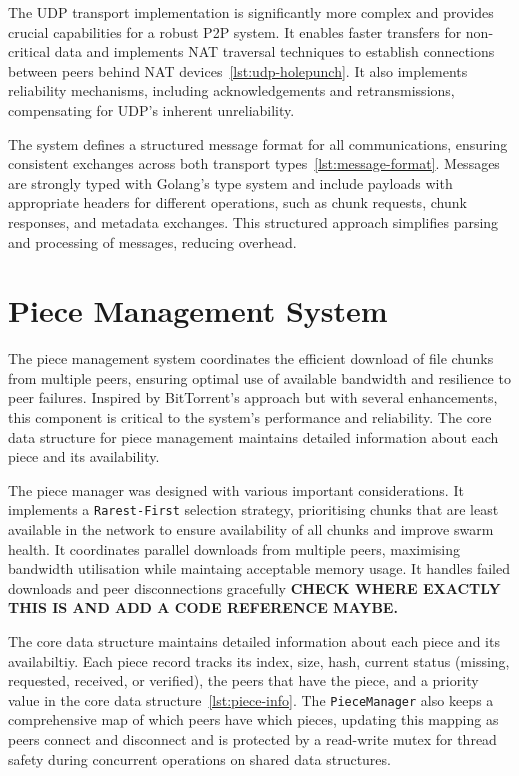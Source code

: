 \documentclass[12pt,a4paper]{report}
\begin{document}
The UDP transport implementation is significantly more complex and provides crucial capabilities for a robust P2P system. It enables faster transfers for non-critical data and implements NAT traversal techniques to establish connections between peers behind NAT devices~\ref{lst:udp-holepunch}. It also implements reliability mechanisms, including acknowledgements and retransmissions, compensating for UDP's inherent unreliability.

The system defines a structured message format for all communications, ensuring consistent exchanges across both transport types~\ref{lst:message-format}. Messages are strongly typed with Golang's type system and include payloads with appropriate headers for different operations, such as chunk requests, chunk responses, and metadata exchanges. This structured approach simplifies parsing and processing of messages, reducing overhead.

\section{Piece Management System}
The piece management system coordinates the efficient download of file chunks from multiple peers, ensuring optimal use of available bandwidth and resilience to peer failures. Inspired by BitTorrent's approach but with several enhancements, this component is critical to the system's performance and reliability. The core data structure for piece management maintains detailed information about each piece and its availability.

The piece manager was designed with various important considerations. It implements a \texttt{Rarest-First} selection strategy, prioritising chunks that are least available in the network to ensure availability of all chunks and improve swarm health. It coordinates parallel downloads from multiple peers, maximising bandwidth utilisation while maintaing acceptable memory usage. It handles failed downloads and peer disconnections gracefully \textbf{CHECK WHERE EXACTLY THIS IS AND ADD A CODE REFERENCE MAYBE.}

The core data structure maintains detailed information about each piece and its availabiltiy. Each piece record tracks its index, size, hash, current status (missing, requested, received, or verified), the peers that have the piece, and a priority value in the core data structure~\ref{lst:piece-info}. The \texttt{PieceManager} also keeps a comprehensive map of which peers have which pieces, updating this mapping as peers connect and disconnect and is protected by a read-write mutex for thread safety during concurrent operations on shared data structures.
\end{document}
